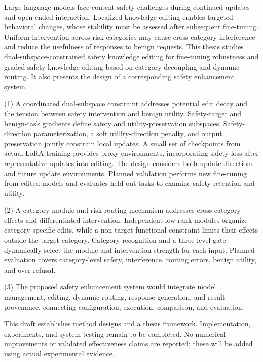 \begin{eabstract}
Large language models face content safety challenges during continued updates and open-ended interaction. Localized knowledge editing enables targeted behavioral changes, whose stability must be assessed after subsequent fine-tuning. Uniform intervention across risk categories may cause cross-category interference and reduce the usefulness of responses to benign requests. This thesis studies dual-subspace-constrained safety knowledge editing for fine-tuning robustness and graded safety knowledge editing based on category decoupling and dynamic routing. It also presents the design of a corresponding safety enhancement system.

(1) A coordinated dual-subspace constraint addresses potential edit decay and the tension between safety intervention and benign utility. Safety-target and benign-task gradients define safety and utility-preservation subspaces. Safety-direction parameterization, a soft utility-direction penalty, and output preservation jointly constrain local updates. A small set of checkpoints from actual LoRA training provides proxy environments, incorporating safety loss after representative updates into editing. The design considers both update directions and future update environments. Planned validation performs new fine-tuning from edited models and evaluates held-out tasks to examine safety retention and utility.

(2) A category-module and risk-routing mechanism addresses cross-category effects and differentiated intervention. Independent low-rank modules organize category-specific edits, while a non-target functional constraint limits their effects outside the target category. Category recognition and a three-level gate dynamically select the module and intervention strength for each input. Planned evaluation covers category-level safety, interference, routing errors, benign utility, and over-refusal.

(3) The proposed safety enhancement system would integrate model management, editing, dynamic routing, response generation, and result provenance, connecting configuration, execution, comparison, and evaluation.

This draft establishes method designs and a thesis framework. Implementation, experiments, and system testing remain to be completed. No numerical improvements or validated effectiveness claims are reported; these will be added using actual experimental evidence.

\end{eabstract}
